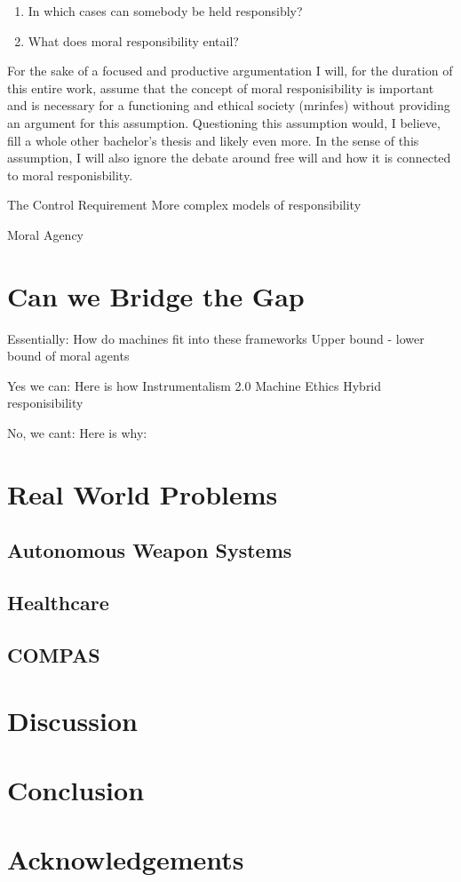 \documentclass{article}
\begin{document}
\begin{enumerate}
	\item In which cases can somebody be held responsibly?
	\item What does moral responsibility entail?
\end{enumerate}
For the sake of a focused and productive argumentation I will, for the duration
of this entire work, assume that the concept of moral responisibility is
important and is necessary for a functioning and ethical society
(\acrshort{mrinfes}) without
providing an argument for this assumption. Questioning this assumption would, I
believe, fill a whole other bachelor's thesis and likely even more. In the sense of
this assumption, I will also ignore the debate around free will and how it is
connected to moral responisbility.

The Control Requirement
More complex models of responsibility

Moral Agency
\section{Can we Bridge the Gap}

Essentially: How do machines fit into these frameworks
Upper bound - lower bound of moral agents

Yes we can: Here is how
Instrumentalism 2.0
Machine Ethics
Hybrid responisibility

No, we cant: Here is why:

\section{Real World Problems}
\subsection{Autonomous Weapon Systems}
\subsection{Healthcare}
\subsection{COMPAS}
\section{Discussion}
\section{Conclusion}
\section{Acknowledgements}
\clearpage

\printglossary[type=\acronymtype]
\printglossary
\printbibliography
\end{document}
